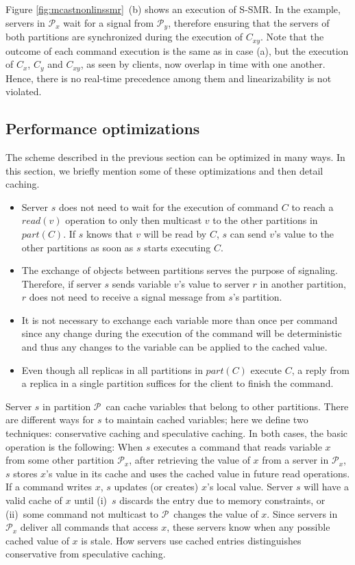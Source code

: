 \documentclass[11pt]{article}
\newcommand{\pp}{$\mathcal{P}$}
\newcommand{\ppm}{\mathcal{P}}
\begin{document}
Figure \ref{fig:mcastnonlinssmr}~(b) shows an execution of S-SMR.
In the example, servers in $\ppm_x$ wait for a signal from $\ppm_y$,
therefore ensuring that the servers of both partitions are synchronized during the execution of $C_{xy}$.
Note that the outcome of each command execution is the same as in case (a), but the execution of $C_x$, $C_y$ and $C_{xy}$, as seen by clients, now overlap in time with one another.
Hence, there is no real-time precedence among them and linearizability is not violated.


\subsection{Performance optimizations}
\label{sec:optm}

The scheme described in the previous section can be optimized in many ways.
In this section, we briefly mention some of these optimizations and then detail caching.
\begin{itemize}
\item Server $s$ does not need to wait for the execution of command $C$ to reach a $read(v)$ operation to only then multicast $v$ to the other partitions in $part(C)$. If $s$ knows that $v$ will be read by $C$, $s$ can send $v$'s value to the other partitions as soon as $s$ starts executing $C$.
\item The exchange of objects between partitions serves the purpose of signaling. Therefore, if server $s$ sends variable $v$'s value to server $r$ in another partition, $r$ does not need to receive a signal message from $s$'s partition.
\item It is not necessary to exchange each variable more than once per command since any change during the execution of the command will be deterministic and thus any changes to the variable can be applied to the cached value.
\item Even though all replicas in all partitions in $part(C)$ execute $C$, a reply from a replica in a single partition suffices for the client to finish the command.
\end{itemize}

Server $s$ in partition \pp\ can cache variables that belong to other partitions.
There are different ways for $s$ to maintain cached variables; here we define two techniques: conservative caching and speculative caching.
In both cases, the basic operation is the following:
When $s$ executes a command that reads variable $x$ from some other partition $\ppm{}_x$, after retrieving the value of $x$ from a server in $\ppm{}_x$, $s$ stores $x$'s value in its cache and uses the cached value in future read operations.
If a command writes $x$, $s$ updates (or creates) $x$'s local value.
Server $s$ will have a valid cache of $x$ until (i)~$s$ discards the entry due to memory constraints, or (ii)~some command not multicast to \pp\ changes the value of $x$.
Since servers in $\ppm_x$ deliver all commands that access $x$, these servers know when any possible cached value of $x$ is stale.
How servers use cached entries distinguishes conservative from speculative caching.
\end{document}
